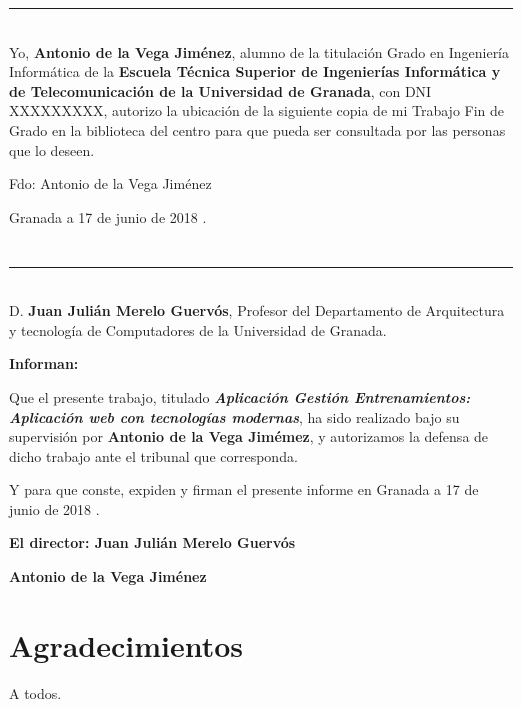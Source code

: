 \noindent\rule[-1ex]{\textwidth}{2pt}\\[4.5ex]

Yo, \textbf{Antonio de la Vega Jiménez}, alumno de la titulación Grado en Ingeniería Informática de la \textbf{Escuela Técnica Superior
de Ingenierías Informática y de Telecomunicación de la Universidad de Granada}, con DNI XXXXXXXXX, autorizo la
ubicación de la siguiente copia de mi Trabajo Fin de Grado en la biblioteca del centro para que pueda ser
consultada por las personas que lo deseen.

\vspace{6cm}

\noindent Fdo: Antonio de la Vega Jiménez

\vspace{2cm}

\begin{flushright}
Granada a 17 de junio de 2018 .
\end{flushright}


\chapter*{}
\thispagestyle{empty}

\noindent\rule[-1ex]{\textwidth}{2pt}\\[4.5ex]

D. \textbf{Juan Julián Merelo Guervós}, Profesor del Departamento de Arquitectura y tecnología de Computadores de la Universidad de Granada.

\vspace{0.5cm}

\textbf{Informan:}

\vspace{0.5cm}

Que el presente trabajo, titulado \textit{\textbf{Aplicación Gestión Entrenamientos: Aplicación web con tecnologías modernas}},
ha sido realizado bajo su supervisión por \textbf{Antonio de la Vega Jimémez}, y autorizamos la defensa de dicho trabajo ante el tribunal
que corresponda.

\vspace{0.5cm}

Y para que conste, expiden y firman el presente informe en Granada a 17 de junio de 2018 .

\vspace{1cm}

\textbf{El director: Juan Julián Merelo Guervós}

\vspace{5cm}

\noindent \textbf{Antonio de la Vega Jiménez \ \ \ \ \ }

\chapter*{Agradecimientos}
\thispagestyle{empty}

       \vspace{1cm}


A todos.

